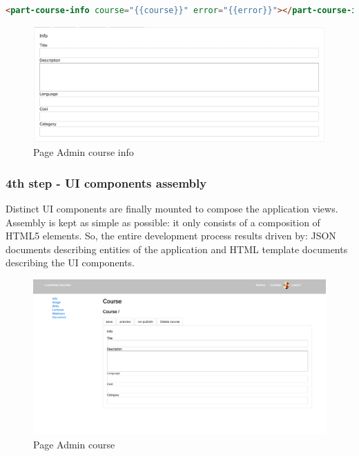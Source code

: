 \begin{lstlisting}[language=html]
<part-course-info course="{{course}}" error="{{error}}"></part-course-info>
\end{lstlisting}


\begin{figure}[htb] %
 \centering
 \includegraphics[width=1.0\linewidth]{images/chapter4/admin-course-info.png}\hfill
 \caption[Page Admin course info]{Page Admin course info}
 \label{fig:fourV}
\end{figure}

\subsubsection {4th step - UI components assembly}
\label{subsec:4th_step_UI_components_assembly}

Distinct UI components are finally mounted to compose the application views. Assembly is kept as simple as possible: it only consists of a composition of HTML5 elements. So, the entire development process results driven by: JSON documents describing entities of the application and HTML template documents describing the UI components.

\begin{figure}[htb] %
 \centering
 \includegraphics[width=1.0\linewidth]{images/chapter4/admin-course.png}\hfill
 \caption[Page Admin course]{Page Admin course}
 \label{fig:fourV}
\end{figure}


